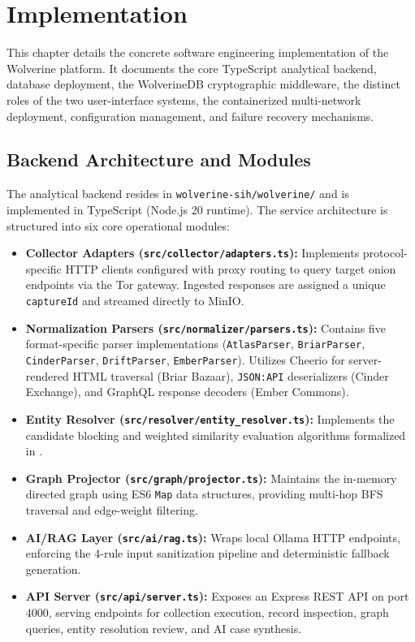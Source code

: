\chapter{Implementation}
\label{ch:implementation}

This chapter details the concrete software engineering implementation of the Wolverine platform. It documents the core TypeScript analytical backend, database deployment, the WolverineDB cryptographic middleware, the distinct roles of the two user-interface systems, the containerized multi-network deployment, configuration management, and failure recovery mechanisms.

\section{Backend Architecture and Modules}
\label{sec:impl-backend}
The analytical backend resides in \texttt{wolverine-sih/wolverine/} and is implemented in TypeScript (Node.js 20 runtime). The service architecture is structured into six core operational modules:

\begin{itemize}
    \item \textbf{Collector Adapters (\texttt{src/collector/adapters.ts}):} Implements protocol-specific HTTP clients configured with proxy routing to query target onion endpoints via the Tor gateway. Ingested responses are assigned a unique \texttt{captureId} and streamed directly to MinIO.
    \item \textbf{Normalization Parsers (\texttt{src/normalizer/parsers.ts}):} Contains five format-specific parser implementations (\texttt{AtlasParser}, \texttt{BriarParser}, \texttt{CinderParser}, \texttt{DriftParser}, \texttt{EmberParser}). Utilizes Cheerio for server-rendered HTML traversal (Briar Bazaar), \texttt{JSON:API} deserializers (Cinder Exchange), and GraphQL response decoders (Ember Commons).
    \item \textbf{Entity Resolver (\texttt{src/resolver/entity\_resolver.ts}):} Implements the candidate blocking and weighted similarity evaluation algorithms formalized in .
    \item \textbf{Graph Projector (\texttt{src/graph/projector.ts}):} Maintains the in-memory directed graph using ES6 \texttt{Map} data structures, providing multi-hop BFS traversal and edge-weight filtering.
    \item \textbf{AI/RAG Layer (\texttt{src/ai/rag.ts}):} Wraps local Ollama HTTP endpoints, enforcing the 4-rule input sanitization pipeline and deterministic fallback generation.
    \item \textbf{API Server (\texttt{src/api/server.ts}):} Exposes an Express REST API on port 4000, serving endpoints for collection execution, record inspection, graph queries, entity resolution review, and AI case synthesis.
\end{itemize}

